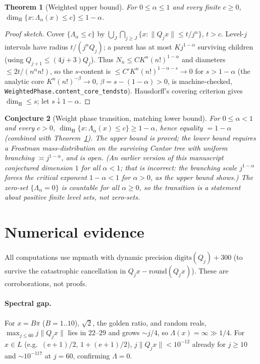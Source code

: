 \documentclass[11pt]{article}
\newtheorem{theorem}{Theorem}
\newtheorem{conjecture}[theorem]{Conjecture}
\theoremstyle{definition}
\theoremstyle{remark}
\newcommand{\ee}{\mathrm{e}}
\newcommand{\dimH}{\dim_{\mathrm{H}}}
\newcommand{\Lam}{\Lambda}
\begin{document}
\begin{theorem}[Weighted upper bound]\label{thm:upper}
For $0\le\alpha\le1$ and every finite $c\ge0$,
$\dimH\{x:\Lam_\alpha(x)\le c\}\le1-\alpha$.
\end{theorem}
\begin{proof}[Proof sketch]
Cover $\{\Lam_\alpha\le c\}$ by $\bigcup_J\bigcap_{j\ge J}\{x:\|Q_jx\|\le t/j^\alpha\}$,
$t>c$. Level-$j$ intervals have radius $t/(j^\alpha Q_j)$; a parent has at most
$K j^{1-\alpha}$ surviving children (using $Q_{j+1}\le(4j+3)Q_j$). Thus
$N_n\le C K^n (n!)^{1-\alpha}$ and diameters $\le2t/(n^\alpha n!)$, so the
$s$-content is $\le C' K^n (n!)^{1-\alpha-s}\to0$ for $s>1-\alpha$
(the analytic core $K^n(n!)^{-\beta}\to0$, $\beta=s-(1-\alpha)>0$, is
machine-checked, \texttt{WeightedPhase.content\_core\_tendsto}). Hausdorff's
covering criterion gives $\dimH\le s$; let $s\downarrow1-\alpha$.
\end{proof}

\begin{conjecture}[Weight phase transition, matching lower bound]\label{conj:weight}
For $0\le\alpha<1$ and every $c>0$,
$\dimH\{x:\Lam_\alpha(x)\le c\}\ge1-\alpha$, hence equality $=1-\alpha$
(combined with Theorem~\ref{thm:upper}). The upper bound is proved; the lower
bound requires a Frostman mass-distribution on the surviving Cantor tree with
uniform branching $\asymp j^{1-\alpha}$, and is open. (An earlier version of
this manuscript conjectured dimension $1$ for all $\alpha<1$; that is
\emph{incorrect}: the branching scale $j^{1-\alpha}$ forces the critical
exponent $1-\alpha<1$ for $\alpha>0$, as the upper bound shows.) The zero-set
$\{\Lam_\alpha=0\}$ is countable for all $\alpha\ge0$, so the transition is a
statement about positive finite level sets, not zero-sets.
\end{conjecture}

\section{Numerical evidence}\label{sec:num}

All computations use mpmath with dynamic precision $\mathrm{digits}(Q_j)+300$
(to survive the catastrophic cancellation in $Q_jx-\mathrm{round}(Q_jx)$).
These are corroborations, not proofs.

\paragraph{Spectral gap.} For $x=B\pi$ ($B=1..10$), $\sqrt2$, the golden ratio,
and random reals, $\max_{j\le60}j\|Q_jx\|$ lies in $22$--$29$ and grows
$\sim j/4$, so $\Lam(x)=\infty\gg1/4$. For $x\in L$ (e.g.\ $(\ee+1)/2$,
$1+(\ee+1)/2$), $j\|Q_jx\|<10^{-12}$ already for $j\ge10$ and $\sim10^{-117}$
at $j=60$, confirming $\Lam=0$.
\end{document}
